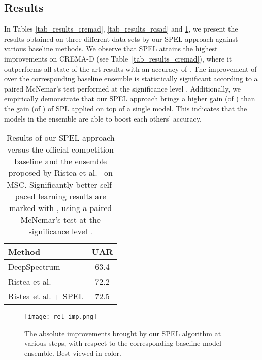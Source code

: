\documentclass[a4paper]{article}
\begin{document}
\subsection{Results}
\vspace{-0.1cm}

In Tables \ref{tab_results_cremad}, \ref{tab_results_rcsad} and \ref{tab_results_msc}, we present the results obtained on three different data sets by our SPEL approach against various baseline methods. We observe that SPEL attains the highest improvements on CREMA-D (see Table~\ref{tab_results_cremad}), where it outperforms all state-of-the-art results with an accuracy of . The improvement of   over the corresponding baseline ensemble is statistically significant according to a paired McNemar's test \cite{Dietterich-NC-1998} performed at the significance level . Additionally, we empirically demonstrate that our SPEL approach brings a higher gain (of ) than the gain (of ) of SPL applied on top of a single model. This indicates that the models in the ensemble are able to boost each others' accuracy.

\begin{table}[!t]
  \caption{Results of our SPEL approach versus the official competition baseline and the ensemble proposed by Ristea et al.~\cite{ristea2020you} on MSC. Significantly better self-paced learning results are marked with , using a paired McNemar's test \cite{Dietterich-NC-1998} at the significance level .}
  \label{tab_results_msc}
  \centering
\vspace{-0.2cm}
\begin{tabular}{l c}
\toprule
{\textbf{Method}} & {\textbf{UAR}}\\
\midrule
DeepSpectrum \cite{Schuller-INTERSPEECH-2020}                   & 63.4 \\
Ristea et al. \cite{ristea2020you}                              & 72.2 \\
\midrule
Ristea et al. \cite{ristea2020you} + SPEL                        & {72.5} \\
\bottomrule
\end{tabular}
\vspace{-0.1cm}
\end{table}

\begin{figure}[t!]
\centering
\texttt{[image: rel\_imp.png]}
  \vspace{-0.5cm}
  \caption{The absolute improvements brought by our SPEL algorithm at various steps, with respect to the corresponding baseline model ensemble. Best viewed in color.}
  \label{fig_rel_imp}
  \vspace{-0.3cm}
\end{figure}
\end{document}
